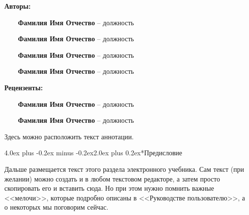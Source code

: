 \documentclass[12pt, a4paper]{book}%
\makeatletter
\renewcommand{\section}{\@startsection{section}{1}{1pt}%
{4.0ex plus -0.2ex minus -0.2ex}{2.0ex plus 0.2ex}{\centering\bf}}%
\makeatother
\begin{document}
{\large%
\begin{flushleft}%
 {\bf\color{red} Авторы:}%


~~~~{\bf Фамилия Имя Отчество} -- должность


~~~~{\bf Фамилия Имя Отчество} -- должность

~~~~{\bf Фамилия Имя Отчество} -- должность

~~~~{\bf Фамилия Имя Отчество} -- должность


\vspace{10mm}%

{\bf\color{red}Рецензенты:}%

~~~~{\bf Фамилия Имя Отчество} -- должность

 ~~~~{\bf Фамилия Имя Отчество} -- должность
\end{flushleft}%

\vspace{10mm}%

 Здесь можно расположить текст аннотации.


\section*{Предисловие}%

 Дальше размещается текст этого раздела электронного учебника. Сам текст (при желании) можно
создать и в любом текстовом редакторе, а затем просто скопировать его и вставить сюда.
Но при этом нужно помнить важные <<мелочи>>, которые подробно описаны в
<<Руководстве пользователю>>, а о некоторых мы поговорим сейчас.

}
\end{document}
